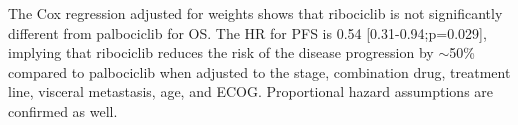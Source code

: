 The Cox regression adjusted for weights shows that ribociclib is not significantly different from palbociclib for OS. The HR for PFS is 0.54 [0.31-0.94;p=0.029], implying that ribociclib reduces the risk of the disease progression by $\sim$50\% compared to palbociclib when adjusted to the stage, combination drug, treatment line, visceral metastasis, age, and ECOG. Proportional hazard assumptions are confirmed as well.
